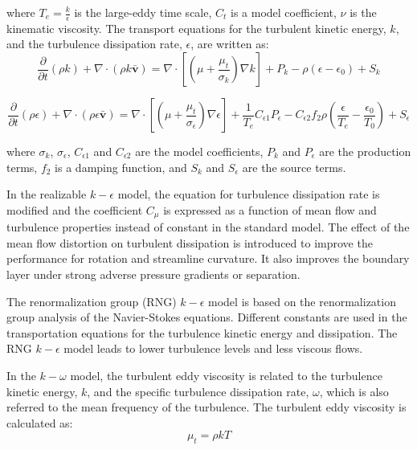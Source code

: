 \documentclass[onecolumn,11pt]{report}
\begin{document}
where $T_e=\frac{k}{\epsilon}$ is the large-eddy time scale, $C_t$ is a model coefficient, $\nu$ is the kinematic viscosity. The transport equations for the turbulent kinetic energy, $k$, and the turbulence dissipation rate, $\epsilon$, are written as:
\begin{equation}
\frac{\partial}{\partial t} (\rho k) + \nabla \cdot (\rho k \bar{\textbf{v}}) = \nabla \cdot \left[ (\mu + \frac{\mu_t}{\sigma_k}) \nabla k \right] + P_k -\rho(\epsilon-\epsilon_0) + S_k
\label{eq8}
\end{equation}

\begin{equation}
\frac{\partial}{\partial t} (\rho \epsilon) + \nabla \cdot (\rho \epsilon \bar{\textbf{v}}) = \nabla \cdot \left[ (\mu + \frac{\mu_t}{\sigma_{\epsilon}}) \nabla \epsilon \right] + \frac{1}{T_e} C_{\epsilon 1} P_{\epsilon} - C_{\epsilon 2} f_2 \rho(\frac{\epsilon}{T_e}-\frac{\epsilon_0}{T_0}) + S_{\epsilon}
\label{eq9}
\end{equation}

where $\sigma_k$, $\sigma_{\epsilon}$, $C_{\epsilon 1}$ and $C_{\epsilon 2}$ are the model coefficients, $P_k$ and $P_{\epsilon}$ are the production terms, $f_2$ is a damping function, and $S_k$ and $S_{\epsilon}$ are the source terms. 

In the realizable $k-\epsilon$ model, the equation for turbulence dissipation rate is modified and the coefficient $C_{\mu}$ is expressed as a function of mean flow and turbulence properties instead of constant in the standard model. The effect of the mean flow distortion on turbulent dissipation is introduced to improve the performance for rotation and streamline curvature. It also improves the boundary layer under strong adverse pressure gradients or separation. 

The renormalization group (RNG) $k-\epsilon$ model is based on  the renormalization group analysis of the Navier-Stokes equations. Different constants are used in the transportation equations for the turbulence kinetic energy and dissipation. The RNG $k-\epsilon$ model leads to lower turbulence levels and less viscous flows. 

In the $k-\omega$ model, the turbulent eddy viscosity is related to the turbulence kinetic energy, $k$, and the specific turbulence dissipation rate, $\omega$, which is also referred to the mean frequency of the turbulence. The turbulent eddy viscosity is calculated as:
\begin{equation}
\mu_t=\rho kT
\label{eq10}
\end{equation}
\end{document}
